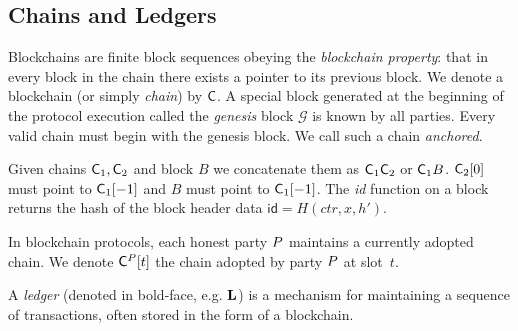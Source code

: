 \subsection{Chains and Ledgers}
Blockchains are finite block sequences obeying the \emph{blockchain property}:
that in every block in the chain there exists a pointer to its previous block.
We denote a blockchain (or simply \emph{chain}) by $\mathsf{C}$. A special block
generated at the beginning of the protocol execution called the \emph{genesis}
block $\mathcal{G}$ is known by all parties. Every valid chain must begin with
the genesis block. We call such a chain \emph{anchored}.

Given chains $\mathsf{C}_1, \mathsf{C}_2$ and block $B$ we concatenate them as
$\mathsf{C}_1 \mathsf{C}_2$ or $\mathsf{C}_1 B$. $\mathsf{C}_2[0]$ must point to $\mathsf{C}_1[-1]$
and $B$ must point to $\mathsf{C}_1[-1]$. The \emph{id} function on a block returns
the hash of the block header data $\textsf{id} = H(ctr, x,
h')$.

In blockchain protocols, each honest party $P$ maintains a currently
adopted chain. We denote $\mathsf{C}^{P}[t]$ the chain adopted by party $P$ at slot~$t$.

A \emph{ledger} (denoted in bold-face, e.g. $\mathbf{L}$) is a mechanism for
maintaining a sequence of transactions, often stored in the form of a
blockchain.

